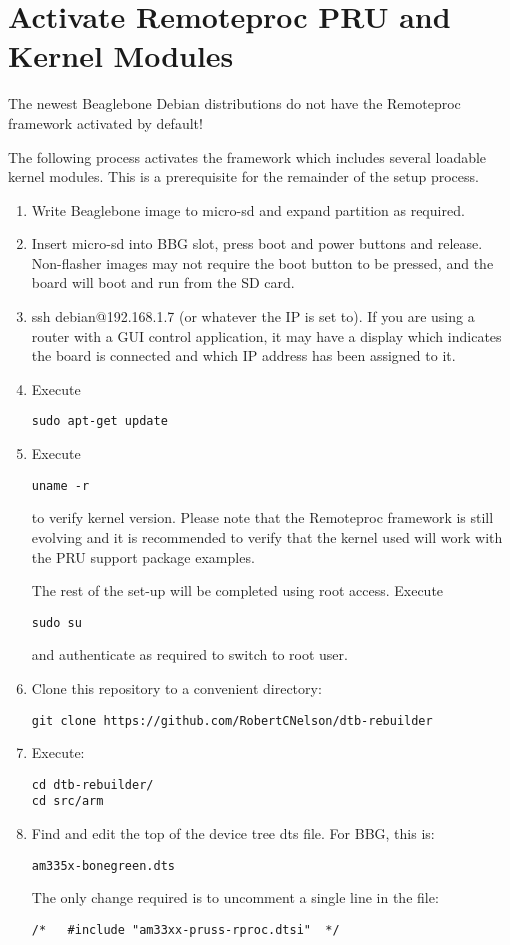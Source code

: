 \section{Activate Remoteproc PRU and Kernel Modules}

The newest Beaglebone Debian distributions do not have the Remoteproc framework activated by default!

The following process activates the framework which includes several loadable kernel modules.  This is a prerequisite for the remainder of the setup process.

\begin{enumerate}
\item  Write Beaglebone image to micro-sd and expand partition as required.
\item  Insert micro-sd into BBG slot, press boot and power buttons and release.  Non-flasher images may not require the boot button to be pressed, and the board will boot and run from the SD card.
\item  ssh debian@192.168.1.7 (or whatever the IP is set to).  If you are using a router with a GUI control application, it may have a display which indicates the board is connected and which IP address has been assigned to it.
\item  Execute
\begin{verbatim}
sudo apt-get update
\end{verbatim}
\item  Execute
\begin{verbatim}
uname -r
\end{verbatim} 
to verify kernel version.  Please note that the Remoteproc framework is still evolving and it is recommended to verify that the kernel used will work with the PRU support package examples.

The rest of the set-up will be completed using root access.
Execute
\begin{verbatim}
sudo su
\end{verbatim}
and authenticate as required to switch to root user.
\item Clone this repository to a convenient directory:

\begin{verbatim}
git clone https://github.com/RobertCNelson/dtb-rebuilder
\end{verbatim}

\item Execute:
\begin{verbatim}
cd dtb-rebuilder/ 
cd src/arm
\end{verbatim}
\item Find and edit the top of the device tree dts file.
For BBG, this is:
\begin{verbatim}
am335x-bonegreen.dts
\end{verbatim}
The only change required is to uncomment a single line in the file:
\begin{verbatim}
/*   #include "am33xx-pruss-rproc.dtsi"  */
\end{verbatim}


\end{enumerate}
